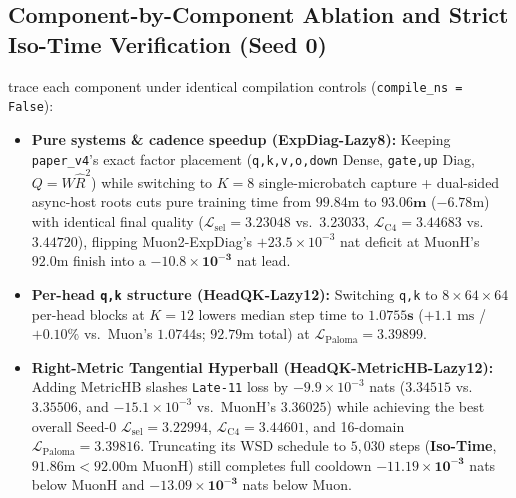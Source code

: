 \documentclass[11pt]{article}
\newcommand{\Lsel}{\mathcal{L}_{\mathrm{sel}}}
\newcommand{\Lc}{\mathcal{L}_{\mathrm{C4}}}
\newcommand{\Lpal}{\mathcal{L}_{\mathrm{Paloma}}}
\newcommand{\mname}[1]{#1}
\begin{document}
\subsection{Component-by-Component Ablation and Strict Iso-Time Verification (Seed 0)}

 trace each component under identical compilation controls (\texttt{compile\_ns = False}):
\begin{itemize}
  \item \textbf{Pure systems \& cadence speedup (\mname{ExpDiag-Lazy8}):} Keeping \texttt{paper\_v4}'s exact factor placement (\texttt{q,k,v,o,down} Dense, \texttt{gate,up} Diag, $Q = W\hat{R}^2$) while switching to $K = 8$ single-microbatch capture + dual-sided async-host roots cuts pure training time from $99.84\text{m}$ to $\mathbf{93.06\text{m}}$ ($-6.78\text{m}$) with identical final quality ($\Lsel = 3.23048$ vs.\ $3.23033$, $\Lc = 3.44683$ vs.\ $3.44720$), flipping \mname{Muon2-ExpDiag}'s $+23.5\times 10^{-3}$ nat deficit at \mname{MuonH}'s $92.0\text{m}$ finish into a $\mathbf{-10.8\times 10^{-3}}$ nat lead.
  \item \textbf{Per-head \texttt{q,k} structure (\mname{HeadQK-Lazy12}):} Switching \texttt{q,k} to $8\times 64\times 64$ per-head blocks at $K = 12$ lowers median step time to $\mathbf{1.0755\text{s}}$ ($+1.1\text{ ms}$ / $+0.10\%$ vs.\ \mname{Muon}'s $1.0744\text{s}$; $92.79\text{m}$ total) at $\Lpal = 3.39899$.
  \item \textbf{Right-Metric Tangential Hyperball (\mname{HeadQK-MetricHB-Lazy12}):} Adding \mname{MetricHB} slashes \texttt{Late-11} loss by $-9.9\times 10^{-3}$ nats ($3.34515$ vs.\ $3.35506$, and $-15.1\times 10^{-3}$ vs.\ \mname{MuonH}'s $3.36025$) while achieving the best overall Seed-0 $\Lsel = \mathbf{3.22994}$, $\Lc = \mathbf{3.44601}$, and 16-domain $\Lpal = \mathbf{3.39816}$. Truncating its WSD schedule to $5{,}030$ steps (\textbf{Iso-Time}, $91.86\text{m} < 92.00\text{m}$ \mname{MuonH}) still completes full cooldown $\mathbf{-11.19\times 10^{-3}}$ nats below \mname{MuonH} and $\mathbf{-13.09\times 10^{-3}}$ nats below \mname{Muon}.
\end{itemize}
\end{document}
